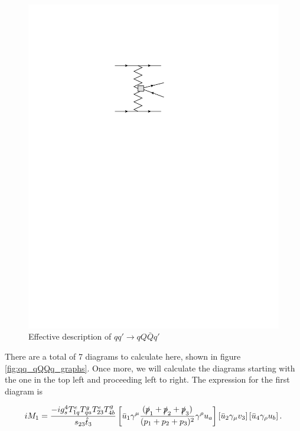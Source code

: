 \begin{figure}[t]
\centering
\includegraphics{Images/qq_qqqq_eff.pdf}
\caption{Effective description of $qq' \to qQ\bar{Q}q'$}
\label{fig:central}
\end{figure}

There are a total of 7 diagrams to calculate here, shown in figure \ref{fig:qq_qQQq_graphs}. Once more, we will calculate the diagrams starting with the one in the top left and proceeding left to right. The expression for the first diagram is

\begin{equation}
iM_1 = \frac{- i g_s^4 T^e_{1q}T^g_{qa}T^e_{23}T^g_{4b}}{s_{23} \hat{t}_3} \left[ \bar{u}_1 \gamma^\mu \frac{(\slashed{p}_1+\slashed{p}_2 + \slashed{p}_3)}{(p_1 + p_2 + p_3)^2} \gamma^\rho u_a \right] \left[\bar{u}_2 \gamma_\mu v_3 \right] \left[ \bar{u}_4 \gamma_\rho u_b \right].
\end{equation}

